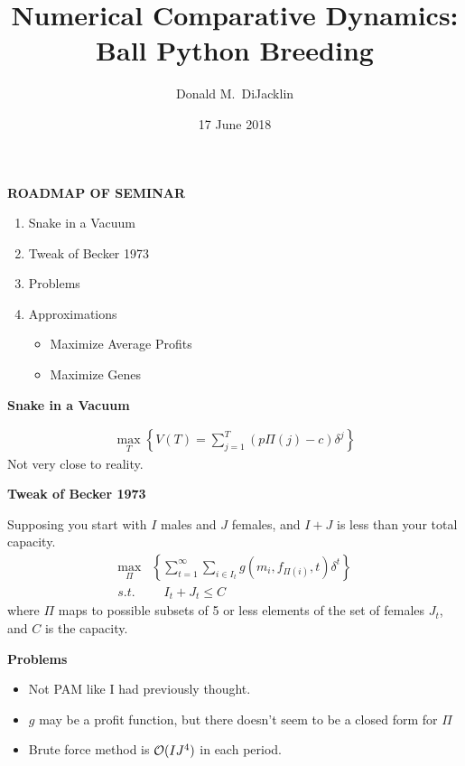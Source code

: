 \documentclass[grey,handout]{beamer}
\renewcommand{\frametitle}[1]{\begin{center}\textbf{#1}\end{center}}
\def\BigO{{\cal O}}
\begin{document}
\title{Numerical Comparative Dynamics: Ball Python Breeding}

\author{Donald M.~DiJacklin}
\date{17 June 2018}

\begin{frame}
  \titlepage
\end{frame}

\begin{frame}
\frametitle{ROADMAP OF SEMINAR}
  \begin{enumerate}[<+->]
    \item Snake in a Vacuum
    \item Tweak of Becker 1973
    \item Problems
    \item Approximations
    \begin{itemize}
      \item Maximize Average Profits
      \item Maximize Genes
    \end{itemize}
  \end{enumerate}
\end{frame}


\begin{frame}
\frametitle{Snake in a Vacuum}
  \begin{align*}
    \max_T\left\{  V(T) = \sum_{j=1}^{T}(p\Pi(j) - c)\delta^j\right\}
  \end{align*}
  Not very close to reality.
  

\end{frame}
\begin{frame}
  \frametitle{Tweak of Becker 1973}
  Supposing you start with $I$ males and $J$ females, and $I+J$  is less than your total capacity.
  \begin{align*}
    \max_\Pi&\left\{ \sum_{t=1}^{\infty}\sum_{i\in I_t}g\left(m_i,f_{\Pi(i)},t\right)\delta^t \right\}\\
    s.t. &\quad I_t+J_t\leq C
  \end{align*}
  where $\Pi$ maps to possible subsets of 5 or less elements of the set of females $J_t$, and $C$ is the capacity.
\end{frame}

\begin{frame}
  \frametitle{Problems}
  \begin{itemize}
    \item Not PAM like I had previously thought.
    \item $g$ may be a profit function, but there doesn't seem to be a closed form for $\Pi$
    
    \item Brute force method is $\BigO(IJ^4)$ in each period.
  \end{itemize}
\end{frame}
\end{document}
